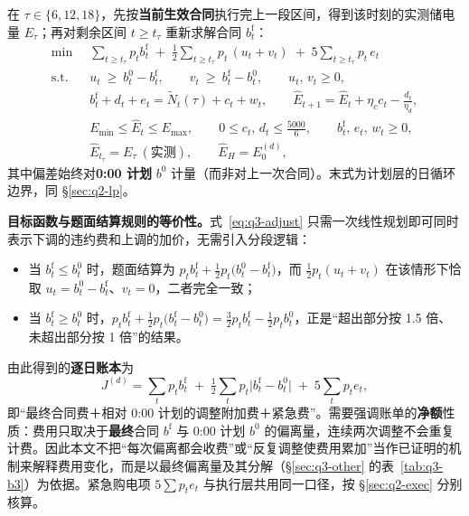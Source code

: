 在 $\tau\in\{6,12,18\}$，先按\textbf{当前生效合同}执行完上一段区间，得到该时刻的实测储电量 $E_\tau$；再对剩余区间 $t\ge t_\tau$ 重新求解合同 $b^{\mathrm f}_t$：
\begin{equation}
\begin{aligned}
  \min\;\; & \sum_{t\ge t_\tau} p_t b^{\mathrm f}_t \;+\; \tfrac12\!\!\sum_{t\ge t_\tau}\! p_t\,(u_t+v_t) \;+\; 5\!\!\sum_{t\ge t_\tau}\! p_t\,e_t \\
  \text{s.t.}\;\;
  & u_t\ \ge\ b_t^{0}-b^{\mathrm f}_t,\qquad v_t\ \ge\ b^{\mathrm f}_t-b_t^{0},\qquad u_t,\,v_t\ge 0, \\
  & b^{\mathrm f}_t+d_t+e_t=\widetilde N_t(\tau)+c_t+w_t,\qquad \widehat E_{t+1}=\widehat E_t+\eta_c c_t-\frac{d_t}{\eta_d},\\
  & E_{\min}\le \widehat E_t\le E_{\max},\qquad 0\le c_t,\,d_t\le \tfrac{5000}{6},\qquad b^{\mathrm f}_t,\,e_t,\,w_t\ge0,\\
  & \widehat E_{t_\tau}=E_\tau\ (\text{实测}),\qquad \widehat E_H=E_0^{(d)} ,
\end{aligned}
  \label{eq:q3-adjust}
\end{equation}
其中偏差始终对\textbf{0:00 计划} $b^{0}$ 计量（而非对上一次合同）。末式为计划层的日循环边界，同 \S\ref{sec:q2-lp}。

\textbf{目标函数与题面结算规则的等价性。}式~\eqref{eq:q3-adjust} 只需一次线性规划即可同时表示下调的违约费和上调的加价，无需引入分段逻辑：
\begin{itemize}
  \item 当 $b^{\mathrm f}_t\le b_t^{0}$ 时，题面结算为 $p_tb^{\mathrm f}_t+\tfrac12p_t\bigl(b_t^{0}-b^{\mathrm f}_t\bigr)$，而 $\tfrac12p_t(u_t+v_t)$ 在该情形下恰取 $u_t=b_t^{0}-b^{\mathrm f}_t$、$v_t=0$，二者完全一致；
  \item 当 $b^{\mathrm f}_t\ge b_t^{0}$ 时，$p_tb^{\mathrm f}_t+\tfrac12p_t\bigl(b^{\mathrm f}_t-b_t^{0}\bigr)=\tfrac32p_tb^{\mathrm f}_t-\tfrac12p_tb_t^{0}$，正是``超出部分按 1.5 倍、未超出部分按 1 倍''的结果。
\end{itemize}
由此得到的\textbf{逐日账本}为
\begin{equation}
  J^{(d)}=\sum_t p_t b^{\mathrm f}_t
  \;+\;\tfrac12\sum_t p_t\bigl|b^{\mathrm f}_t-b^{0}_t\bigr|
  \;+\;5\sum_t p_t e_t ,
  \label{eq:q3-cost}
\end{equation}
即``最终合同费＋相对 0:00 计划的调整附加费＋紧急费''。需要强调账单的\textbf{净额}性质：费用只取决于\textbf{最终}合同 $b^{\mathrm f}$ 与 0:00 计划 $b^{0}$ 的偏离量，连续两次调整不会重复计费。因此本文不把``每次偏离都会收费''或``反复调整使费用累加''当作已证明的机制来解释费用变化，而是以最终偏离量及其分解（\S\ref{sec:q3-other} 的表~\ref{tab:q3-b3}）为依据。紧急购电项 $5\sum p_te_t$ 与执行层共用同一口径，按 \S\ref{sec:q2-exec} 分别核算。

